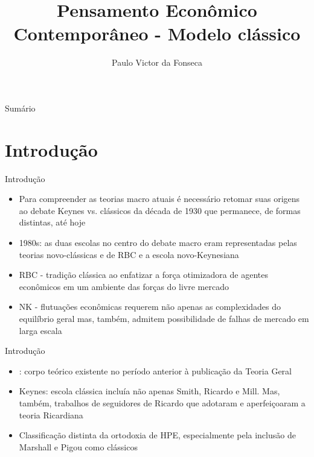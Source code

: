\documentclass[10pt]{beamer}
\title[]{Pensamento Econômico Contemporâneo - Modelo clássico}
\author[]{Paulo Victor da Fonseca}
\date{}
\begin{document}
\begin{frame}[plain]
\end{frame}

\begin{frame}{Sumário}
    \tableofcontents
\end{frame}

\section{Introdução}
\begin{frame}{Introdução}
    \begin{itemize}
        \item Para compreender as teorias macro atuais é necessário retomar suas origens ao debate Keynes vs. clássicos da década de 1930 que permanece, de formas distintas, até hoje\bigskip

        \item 1980s: as duas escolas no centro do debate macro eram representadas pelas teorias novo-clássicas e de RBC e a escola novo-Keynesiana\bigskip

        \item RBC - tradição clássica ao enfatizar a força otimizadora de agentes econômicos em um ambiente das forças do livre mercado\bigskip

        \item NK - flutuações econômicas requerem não apenas as complexidades do equilíbrio geral mas, também, admitem possibilidade de falhas de mercado em larga escala
    \end{itemize}
\end{frame}

\begin{frame}{Introdução}
    \begin{itemize}
        \item {}: corpo teórico existente no período anterior à publicação da Teoria Geral\bigskip

        \item Keynes: escola clássica incluía não apenas Smith, Ricardo e Mill. Mas, também, trabalhos de seguidores de Ricardo que adotaram e aperfeiçoaram a teoria Ricardiana\bigskip

        \item Classificação distinta da ortodoxia de HPE, especialmente pela inclusão de Marshall e Pigou como clássicos
    \end{itemize}
\end{frame}
\end{document}
